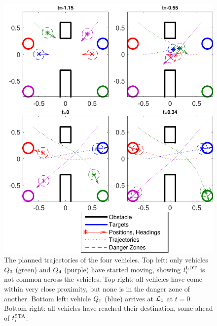 \begin{figure}
	\centering
	\includegraphics[width=\columnwidth]{"fig/dubins_result"}
	\caption{The planned trajectories of the four vehicles. Top left: only vehicles $Q_3$ (green) and $Q_4$ (purple) have started moving, showing $t^\text{LDT}_i$ is not common across the vehicles. Top right: all vehicles have come within very close proximity, but none is in the danger zone of another. Bottom left: vehicle $Q_1$ (blue) arrives at $\mathcal{L}_1$ at $t=0$. Bottom right: all vehicles have reached their destination, some ahead of $t^\text{STA}_i$.}
	\label{fig:dubins_result}
\end{figure}